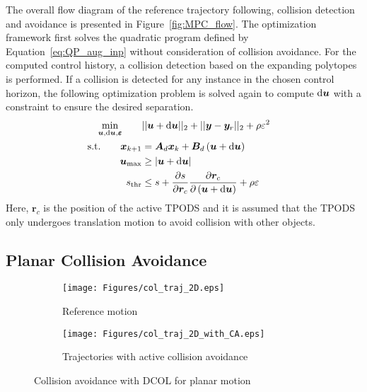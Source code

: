 The overall flow diagram of the reference trajectory following, collision detection and avoidance is presented in Figure~\ref{fig:MPC_flow}. The optimization framework first solves the quadratic program defined by Equation~\ref{eq:QP_aug_inp} without consideration of collision avoidance. For the computed control history, a collision detection based on the expanding polytopes is performed. If a collision is detected for any instance in the chosen control horizon, the following optimization problem is solved again to compute $\mathop{}\!\mathrm{d}{\bm{u}}$ with a constraint to ensure the desired separation.
\begin{align}
    \min_{\bm{u},\mathop{}\!\mathrm{d}{\bm{u}},\boldsymbol{\varepsilon}} \qquad &\lvert|\bm{u} + \mathop{}\!\mathrm{d}{\bm{u}}|\rvert_2 + \lvert|\boldsymbol{y}-\boldsymbol{y}_{r}|\rvert_2 + \rho\varepsilon^2 \\
    \text{s.t.} \qquad \bm{x}_{k+1} &= \boldsymbol{A}_d\boldsymbol{x}_k + \boldsymbol{B}_d\left( \bm{u} + \mathop{}\!\mathrm{d}{\bm{u}} \right)&\\
    \bm{u}_{\max} &\geq \lvert\bm{u}+\mathop{}\!\mathrm{d}{\bm{u}}\rvert \\
    s_\text{thr} &\leq s + \pdv{s}{\bm{r}_c} \pdv{\bm{r}_c}{\left(\bm{u}+\mathop{}\!\mathrm{d}{\bm{u}}\right)} + \rho \varepsilon 
\end{align}
Here, $\bm{r}_c$ is the position of the active TPODS and it is assumed that the TPODS only undergoes translation motion to avoid collision with other objects.
\subsection{Planar Collision Avoidance}
\begin{figure}[t!]
     \begin{subfigure}[b]{0.49\textwidth}
        \centering
         \texttt{[image: Figures/col\_traj\_2D.eps]}
         \caption{Reference motion}\label{fig:col_traj_2D_a}
     \end{subfigure}   
     \begin{subfigure}[b]{0.49\textwidth}
        \centering
         \texttt{[image: Figures/col\_traj\_2D\_with\_CA.eps]}
         \caption{Trajectories with active collision avoidance}\label{fig:col_traj_2D_b}
     \end{subfigure}
     \centering
    \caption{Collision avoidance with DCOL for planar motion}
\end{figure}

